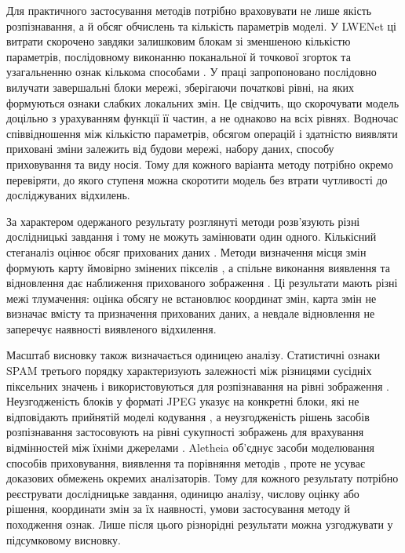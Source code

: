 Для практичного застосування методів потрібно враховувати не лише якість розпізнавання, а й обсяг обчислень та кількість параметрів моделі. У LWENet ці витрати скорочено завдяки залишковим блокам зі зменшеною кількістю параметрів, послідовному виконанню поканальної й точкової згорток та узагальненню ознак кількома способами \cite{weng2022lwenet}. У праці \cite{hong2023blockpruning} запропоновано послідовно вилучати завершальні блоки мережі, зберігаючи початкові рівні, на яких формуються ознаки слабких локальних змін. Це свідчить, що скорочувати модель доцільно з урахуванням функції її частин, а не однаково на всіх рівнях. Водночас співвідношення між кількістю параметрів, обсягом операцій і здатністю виявляти приховані зміни залежить від будови мережі, набору даних, способу приховування та виду носія. Тому для кожного варіанта методу потрібно окремо перевіряти, до якого ступеня можна скоротити модель без втрати чутливості до досліджуваних відхилень.

За характером одержаного результату розглянуті методи розв’язують різні дослідницькі завдання і тому не можуть замінювати один одного. Кількісний стеганаліз оцінює обсяг прихованих даних \cite{singhal2024ustegdse}. Методи визначення місця змін формують карту ймовірно змінених пікселів \cite{ntivuguruzwa2023localization}, а спільне виконання виявлення та відновлення дає наближення прихованого зображення \cite{lai2022ffrnet}. Ці результати мають різні межі тлумачення: оцінка обсягу не встановлює координат змін, карта змін не визначає вмісту та призначення прихованих даних, а невдале відновлення не заперечує наявності виявленого відхилення.

Масштаб висновку також визначається одиницею аналізу. Статистичні ознаки SPAM третього порядку характеризують залежності між різницями сусідніх піксельних значень і використовуються для розпізнавання на рівні зображення \cite{hemalatha2023spam}. Неузгодженість блоків у форматі JPEG указує на конкретні блоки, які не відповідають прийнятій моделі кодування \cite{levecque2024jpeg}, а неузгодженість рішень засобів розпізнавання застосовують на рівні сукупності зображень для врахування відмінностей між їхніми джерелами \cite{lerch2023actor}. Aletheia об’єднує засоби моделювання способів приховування, виявлення та порівняння методів \cite{lerch2024aletheia}, проте не усуває доказових обмежень окремих аналізаторів. Тому для кожного результату потрібно реєструвати дослідницьке завдання, одиницю аналізу, числову оцінку або рішення, координати змін за їх наявності, умови застосування методу й походження ознак. Лише після цього різнорідні результати можна узгоджувати у підсумковому висновку.

